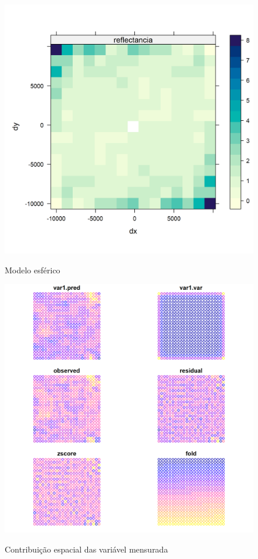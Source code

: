  			\begin{minipage}[t!]{0.31\textwidth}
 				
 				\begin{figure}[H]
 					\centering \small \caption{Modelo esférico}
 					\includegraphics[width=0.97\linewidth]{FIGURAS/varexpmap}
 					\label{fig:htrrtyR}
 				\end{figure}			
 				
 			\end{minipage} 
 			\begin{minipage}[t!]{0.31\textwidth}
 				
 				\begin{figure}[H]
 					\centering \small \caption{Contribuição espacial das variável mensurada}
 					\includegraphics[width=0.97\linewidth]{FIGURAS/xvalid.sph-map}
 					\label{fig:Rplothddg}
 				\end{figure}		
 			\end{minipage} 
 			
